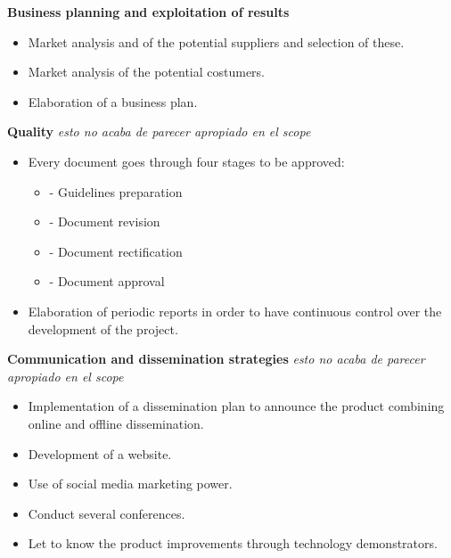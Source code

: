 {\bfseries Business planning and exploitation of results}
\begin{itemize}
	\item Market analysis and of the potential suppliers and selection of these.
	\item Market analysis of the potential costumers.
	\item Elaboration of a business plan. 

\end{itemize}

\textbf{Quality} \textit{esto no acaba de parecer apropiado en el scope}
\begin{itemize}
	\item Every document goes through four stages to be approved:
	\begin{itemize}
		\item{-} Guidelines preparation
		\item{-} Document revision
		\item{-} Document rectification
		\item{-} Document approval
	\end{itemize}
	\item Elaboration of periodic reports in order to have continuous control over the development of the project.

\end{itemize}

\textbf{Communication and dissemination strategies} \textit{esto no acaba de parecer apropiado en el scope}

\begin{itemize}
	\item Implementation of a dissemination plan to announce the product combining online and offline dissemination.	
	 \item Development of 
	  a website. 
	  \item Use of social media marketing power. 
	  \item Conduct several conferences.
	  \item  Let to know the product improvements through technology demonstrators.
\end{itemize}




